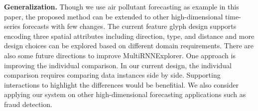 \textbf{Generalization.}
Though we use air pollutant forecasting as example in this paper, the proposed method can be extended to other high-dimensional time-series forecasts with few changes. 
The current feature glyph design supports encoding three spatial attributes including direction, type, and distance and more design choices can be explored based on different domain requirements. 
There are also some future directions to improve MultiRNNExplorer.
One approach is improving the individual comparison. 
In our current design, the individual comparison requires comparing data instances side by side. 
Supporting interactions to highlight the differences would be benefitial.
We also consider applying our system on other high-dimensional forecasting applications such as fraud detection.

